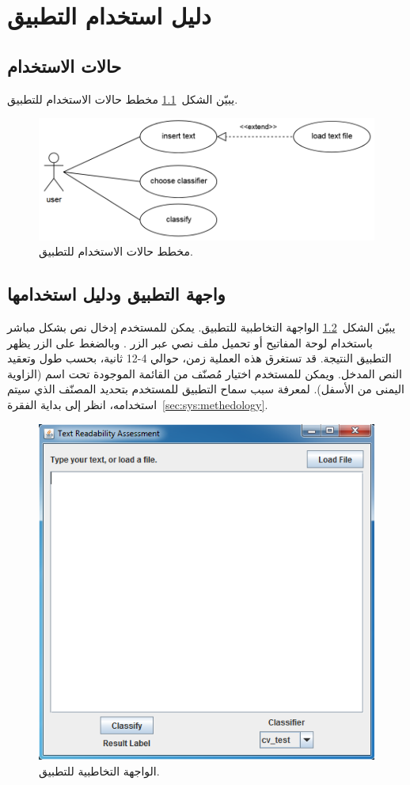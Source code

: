 

\chapter{دليل استخدام التطبيق}


\section{حالات الاستخدام}
يبيّن الشكل~\ref{fig:man:use-case} مخطط حالات الاستخدام للتطبيق.

\begin{figure}[htb]
	\centering
	\includegraphics[width=0.8\linewidth]{images/use-case-diagram.png}
	\caption{%
		مخطط حالات الاستخدام للتطبيق.
	}
	\label{fig:man:use-case}
\end{figure}


\section{واجهة التطبيق ودليل استخدامها}

يبيّن الشكل~\ref{fig:man:gui} الواجهة التخاطبية للتطبيق.
يمكن للمستخدم إدخال نص بشكل مباشر باستخدام لوحة المفاتيح أو تحميل ملف نصي عبر الزر .
وبالضغط على الزر  يظهر التطبيق النتيجة.
قد تستغرق هذه العملية زمن، حوالي 4-12 ثانية، بحسب طول وتعقيد النص المدخل.
ويمكن للمستخدم اختيار مُصنّف من القائمة الموجودة تحت اسم  (الزاوية اليمنى من الأسفل).
لمعرفة سبب سماح التطبيق للمستخدم بتحديد المصنّف الذي سيتم استخدامه،
انظر إلى بداية الفقرة~\ref{sec:sys:methedology}.


\begin{figure}[htb]
	\centering
	\includegraphics[width=0.7\linewidth]{images/app-gui.png}
	\caption{%
		الواجهة التخاطبية للتطبيق.
	}
	\label{fig:man:gui}
\end{figure}

